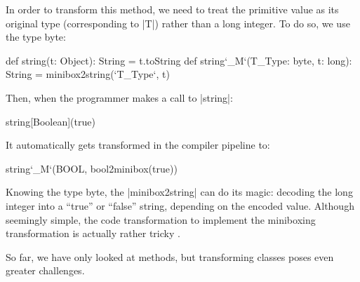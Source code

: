 In order to transform this method, we need to treat the primitive value as its original type (corresponding to |T|) rather than a long integer. To do so, we use the type byte:

\begin{lstlisting-nobreak}
 def string(t: Object): String = t.toString
 def string`_M`(T_Type: byte, t: long): String =
                                       minibox2string(`T_Type`, t)
\end{lstlisting-nobreak}

Then, when the programmer makes a call to |string|:

\begin{lstlisting-nobreak}
 string[Boolean](true)
\end{lstlisting-nobreak}

It automatically gets transformed in the compiler pipeline to:

\begin{lstlisting-nobreak}
 string`_M`(BOOL, bool2minibox(true))
\end{lstlisting-nobreak}

Knowing the type byte, the |minibox2string| can do its magic: decoding the long integer into a ``true'' or ``false'' string, depending on the encoded value. Although seemingly simple, the code transformation to implement the miniboxing transformation is actually rather tricky \cite{miniboxing-linkedlist, ldl, ildl-tech}.

So far, we have only looked at methods, but transforming classes poses even greater challenges.



%
%
%
%
%
%
%
%
%
%
%
%
%
%
%


